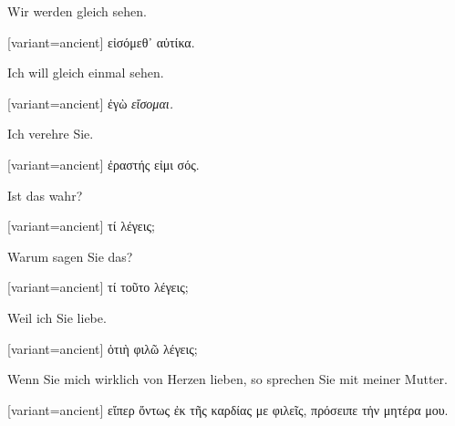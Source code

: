 Wir werden gleich sehen. 

\switchcolumn

\begin{greek}[variant=ancient]%
εἰσόμεθ᾽ αὐτίκα.

\end{greek}%
\switchcolumn*

Ich will gleich einmal sehen. 

\switchcolumn

\begin{greek}[variant=ancient]%
ἐγὼ \emph{εἴσομαι.}

\end{greek}%
Ich verehre Sie. 

\switchcolumn

\begin{greek}[variant=ancient]%
ἐραστής εἰμι σός.

\end{greek}%
\switchcolumn*

Ist das wahr? 

\switchcolumn

\begin{greek}[variant=ancient]%
τί λέγεις;

\end{greek}%
\switchcolumn*

Warum sagen Sie das? 

\switchcolumn

\begin{greek}[variant=ancient]%
τί τοῦτο λέγεις;

\end{greek}%
\switchcolumn*

Weil ich Sie liebe. 

\switchcolumn

\begin{greek}[variant=ancient]%
ὁτιὴ φιλῶ λέγεις;

\end{greek}%
\switchcolumn*

Wenn Sie mich wirklich von Herzen lieben, so sprechen Sie mit meiner
Mutter. 

\switchcolumn

\begin{greek}[variant=ancient]%
εἴπερ ὄντως ἐκ τῆς καρδίας με φιλεῖς, πρόσειπε τἡν μητέρα μου.

\end{greek}%
\switchcolumn*

